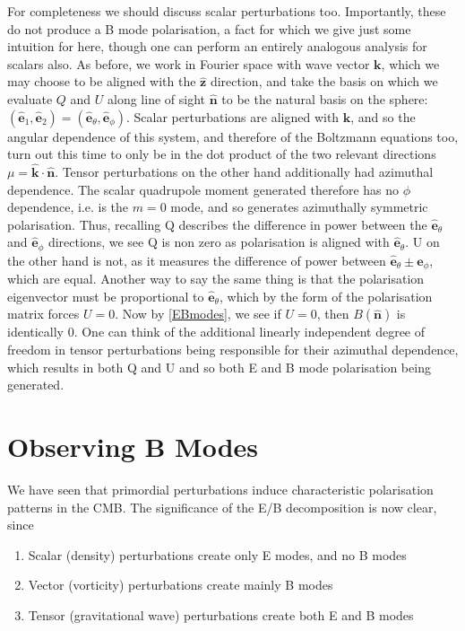 \documentclass[a4paper,10pt]{article}
\renewcommand{\v}[1]{\mathbf{#1}}
\newcommand{\unit}[1]{\hat{\v{#1}}}
\begin{document}
For completeness we should discuss scalar perturbations too. Importantly, these do not produce a B mode polarisation, a fact for which we give just some intuition for here, though one can perform an entirely analogous analysis for scalars also. As before, we work in Fourier space with wave vector $\v{k}$, which we may choose to be aligned with the $\unit{z}$ direction, and take the basis on which we evaluate $Q$ and $U$ along line of sight $\unit{n}$ to be the natural basis on the sphere: $(\unit{e}_1, \unit{e}_2) = (\unit{e}_\theta, \unit{e}_\phi)$. Scalar perturbations are aligned with $\v{k}$, and so the angular dependence of this system, and therefore of the Boltzmann equations too, turn out this time to only be in the dot product of the two relevant directions $\mu=\unit{k}\cdot\unit{n}$. Tensor perturbations on the other hand additionally had azimuthal dependence. The scalar quadrupole moment generated therefore has no $\phi$ dependence, i.e. is the $m=0$ mode, and so generates azimuthally symmetric polarisation. Thus, recalling Q describes the difference in power between the $\unit{e}_\theta$ and $\unit{e}_\phi$ directions, we see Q is non zero as polarisation is aligned with $\unit{e}_\theta$. U on the other hand is not, as it measures the difference of power between $\unit{e}_\theta\pm\unit{e}_\phi$, which are equal. Another way to say the same thing is that the polarisation eigenvector must be proportional to $\unit{e}_\theta$, which by the form of the polarisation matrix forces $U=0$. Now by \ref{EBmodes}, we see if $U=0$, then $B(\unit{n})$ is identically 0. One can think of the additional linearly independent degree of freedom in tensor perturbations being responsible for their azimuthal dependence, which results in both Q and U and so both E and B mode polarisation being generated. 


\newpage
\section{Observing B Modes}

We have seen that primordial perturbations induce characteristic polarisation patterns in the CMB. The significance of the E/B decomposition is now clear, since

\begin{enumerate}
\item Scalar (density) perturbations create only E modes, and no B modes
\item Vector (vorticity) perturbations create mainly B modes
\item Tensor (gravitational wave) perturbations create both E and B modes
\end{enumerate}
\end{document}
